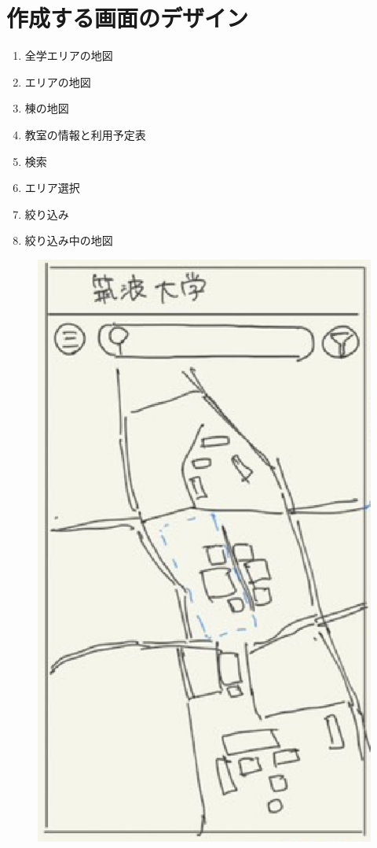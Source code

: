 \documentclass[12pt,a4paper,dvipdf]{jsarticle}
\begin{document}
\section{作成する画面のデザイン}
\begin{enumerate}
    \item 全学エリアの地図
    \item エリアの地図
    \item 棟の地図
    \item 教室の情報と利用予定表
    \item 検索
    \item エリア選択
    \item 絞り込み
    \item 絞り込み中の地図
\end{enumerate}
\begin{figure}[H]
    \centering
    \begin{minipage}[b]{0.24\columnwidth}
        \centering
        \includegraphics[width=0.9\columnwidth]{./img/全学地図.png}

\end{minipage}
\end{figure}
\end{document}
